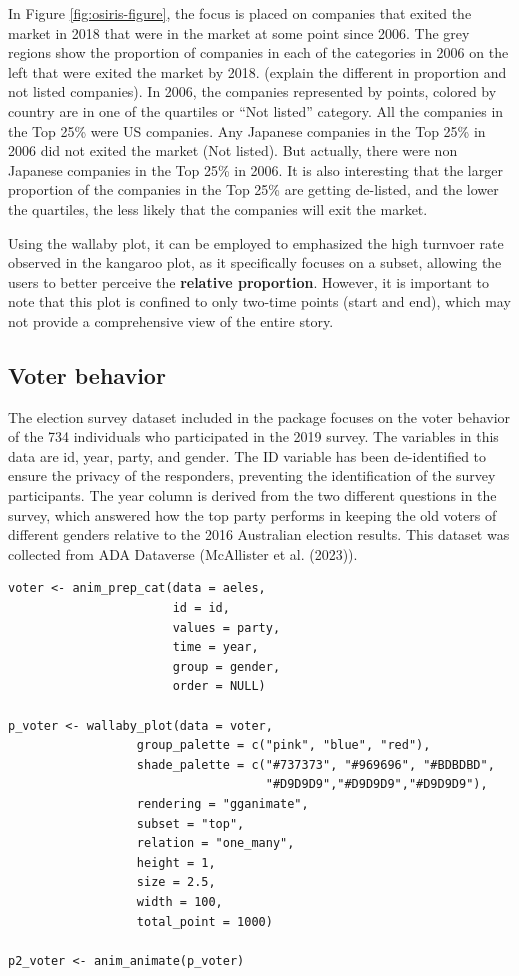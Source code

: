 In Figure \ref{fig:osiris-figure}, the focus is placed on companies that exited the market in 2018 that were in the market at some point since 2006. The grey regions show the proportion of companies in each of the categories in 2006 on the left that were exited the market by 2018. (explain the different in proportion and not listed companies). In 2006, the companies represented by points, colored by country are in one of the quartiles or ``Not listed'' category. All the companies in the Top 25\% were US companies. Any Japanese companies in the Top 25\% in 2006 did not exited the market (Not listed). But actually, there were non Japanese companies in the Top 25\% in 2006. It is also interesting that the larger proportion of the companies in the Top 25\% are getting de-listed, and the lower the quartiles, the less likely that the companies will exit the market.

Using the wallaby plot, it can be employed to emphasized the high turnvoer rate observed in the kangaroo plot, as it specifically focuses on a subset, allowing the users to better perceive the \textbf{relative proportion}. However, it is important to note that this plot is confined to only two-time points (start and end), which may not provide a comprehensive view of the entire story.

\hypertarget{voter-behavior}{%
\subsection{Voter behavior}\label{voter-behavior}}

The election survey dataset included in the  package focuses on the voter behavior of the 734 individuals who participated in the 2019 survey. The variables in this data are id, year, party, and gender. The ID variable has been de-identified to ensure the privacy of the responders, preventing the identification of the survey participants. The year column is derived from the two different questions in the survey, which answered how the top party performs in keeping the old voters of different genders relative to the 2016 Australian election results. This dataset was collected from ADA Dataverse (McAllister et al. (2023)).

\begin{verbatim}
voter <- anim_prep_cat(data = aeles,
                       id = id,
                       values = party,
                       time = year,
                       group = gender,
                       order = NULL)

p_voter <- wallaby_plot(data = voter,
                  group_palette = c("pink", "blue", "red"),
                  shade_palette = c("#737373", "#969696", "#BDBDBD",
                                    "#D9D9D9","#D9D9D9","#D9D9D9"),
                  rendering = "gganimate",
                  subset = "top",
                  relation = "one_many",
                  height = 1,
                  size = 2.5,
                  width = 100,
                  total_point = 1000)

p2_voter <- anim_animate(p_voter)
\end{verbatim}

